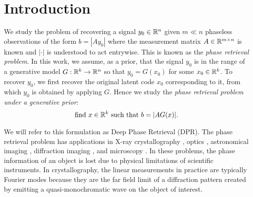 \documentclass{article}
\begin{document}
\section{Introduction}

We study the problem of recovering a signal $y_0 \in \mathbb{R}^n$ given $m \ll n$ phaseless observations of the form $b = |Ay_0|$ where the measurement matrix $A \in \mathbb{R}^{m \times n}$ is known and $|\cdot|$ is understood to act entrywise. This is known as the \textit{phase retrieval problem}. In this work, we assume, as a prior, that the signal $y_0$ is in the range of a generative model $G : \mathbb{R}^k \rightarrow \mathbb{R}^n$ so that $y_0 = G(x_0)$ for some $x_0 \in \mathbb{R}^k$. To recover $y_0$, we first recover the original latent code $x_0$ corresponding to it, from which $y_0$ is obtained by applying $G$. Hence we study the \textit{phase retrieval problem under a generative prior}: \[
\text{find}\ x \in \R^k\ \text{such that}\ b = |AG(x)|.
\] 

We will refer to this formulation as Deep Phase Retrieval (DPR). The phase retrieval problem has applications in X-ray crystallography \cite{Harrison93,Millane90}, optics \cite{Walther1963}, astronomical imaging \cite{Fienup87}, diffraction imaging \cite{diffImaging}, and microscopy \cite{MicroscopyPR}. In these problems, the phase information of an object is lost due to physical limitations of scientific instruments. In crystallography, the linear measurements in practice are typically Fourier modes because they are the far field limit of a diffraction pattern created by emitting a quasi-monochromatic wave on the object of interest.
\end{document}
